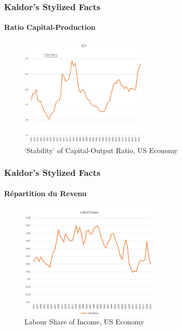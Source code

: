 \documentclass{beamer}
\begin{document}
\begin{frame}
    \frametitle{Kaldor's Stylized Facts}
    \hypertarget{capital_output_ratio}{} %
    \framesubtitle{Ratio Capital-Production}
        \begin{figure}
            \centering
            \includegraphics[width=0.55\textwidth]{graphs/kyratio_usa.png}
            \caption{\enquote*{Stability} of Capital-Output Ratio, US Economy
            \hyperlink{kaldor}{}}
        \end{figure}
        
\end{frame}


\begin{frame}
    \frametitle{Kaldor's Stylized Facts}
    \hypertarget{income}{} %
    \framesubtitle{Répartition du Revenu}
        \begin{figure}
            \centering
            \includegraphics[width=0.6\textwidth]{graphs/labor_share.png}
            \caption{Labour Share of Income, US Economy
            \hyperlink{kaldor}{}}
        \end{figure}
\end{frame}
\end{document}
